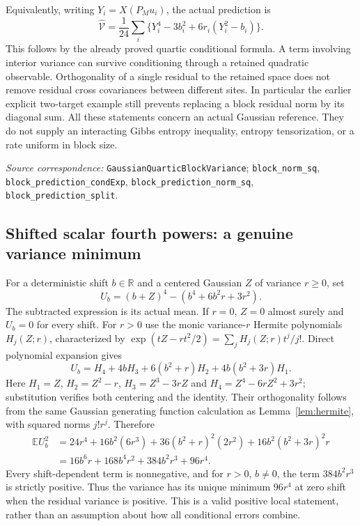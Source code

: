 \documentclass[11pt]{article}
\newcommand{\R}{\mathbb R}\newcommand{\E}{\mathbb E}
\newcommand{\code}[1]{{\small\nolinkurl{#1}}}
\begin{document}
Equivalently, writing $Y_i=X(P_Mu_i)$, the actual prediction is
\[
 \widehat{\mathcal V}
 =\frac1{24}\sum_i
 \big\{Y_i^4-3b_i^2+6r_i(Y_i^2-b_i)\big\}.
\]
This follows by the already proved quartic conditional formula. A term
involving interior variance can survive conditioning through a retained
quadratic observable. Orthogonality of a single residual to the retained
space does not remove residual cross covariances between different
sites. In particular the earlier explicit two-target example still
prevents replacing a block residual norm by its diagonal sum.
All these statements concern an actual Gaussian reference. They do not
supply an interacting Gibbs entropy inequality, entropy tensorization,
or a rate uniform in block size.
\par\smallskip\begingroup\small\raggedright
\textit{Source correspondence:} \code{GaussianQuarticBlockVariance};
\code{block_norm_sq}, \code{block_prediction_condExp},
\code{block_prediction_norm_sq}, \code{block_prediction_split}.
\par\endgroup

\subsection*{Shifted scalar fourth powers: a genuine variance minimum}
For a deterministic shift $b\in\R$ and a centered Gaussian $Z$ of variance
$r\geq0$, set
\[
 U_b=(b+Z)^4-(b^4+6b^2r+3r^2).
\]
The subtracted expression is its actual mean. If $r=0$, $Z=0$ almost
surely and $U_b=0$ for every shift. For $r>0$ use the monic variance-$r$
Hermite polynomials $H_j(Z;r)$, characterized by
$\exp(tZ-rt^2/2)=\sum_j H_j(Z;r)t^j/j!$.
Direct polynomial expansion gives
\[
 U_b=H_4+4bH_3+6(b^2+r)H_2+4b(b^2+3r)H_1.
\]
Here $H_1=Z$, $H_2=Z^2-r$, $H_3=Z^3-3rZ$ and
$H_4=Z^4-6rZ^2+3r^2$; substitution verifies both centering and the
identity. Their orthogonality follows from the same Gaussian generating
function calculation as Lemma~\ref{lem:hermite}, with squared norms
$j!r^j$. Therefore
\begin{align}\label{eq:shiftquartic}
 \E U_b^2
 &=24r^4+16b^2(6r^3)+36(b^2+r)^2(2r^2)
       +16b^2(b^2+3r)^2r\\
 &=16b^6r+168b^4r^2+384b^2r^3+96r^4.\nonumber
\end{align}
Every shift-dependent term is nonnegative, and for $r>0$, $b\ne0$,
the term $384b^2r^3$ is strictly positive. Thus the variance has its
unique minimum $96r^4$ at zero shift when the residual variance is
positive. This is a valid positive local statement, rather than an
assumption about how all conditional errors combine.
\end{document}
